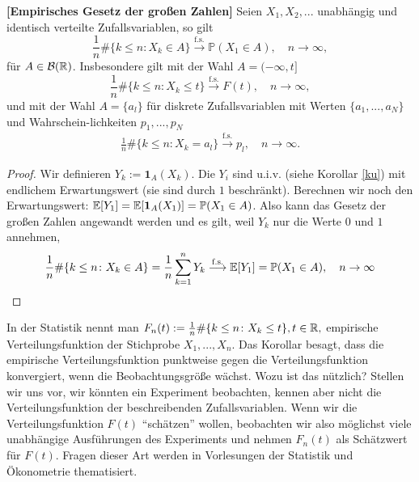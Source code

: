 \begin{anwendung}
 \textbf{[Empirisches Gesetz der großen Zahlen]}
	\makeatletter\def\@currentlabel{EGGZ}\makeatother\label{EGGZ}
	Seien $X_1, X_2, ...$ unabh\"angig und identisch verteilte Zufallsvariablen, so gilt
	 \[ \frac{1}{n} \# \{ k\leq n \colon X_k\in A \}\overset{\text{f.s.}}{\longrightarrow} \mathbb{P}(X_1 \in A), \quad n \to \infty, \]
	für $A \in \mathcal{B}(\mathbb{R})$. Insbesondere gilt mit der Wahl $A = (-\infty,t]$
	\[ \frac{1}{n} \# \{ k \leq n \colon X_k \leq t \} \overset{\text{f.s.}}{\longrightarrow} F(t), \quad n \to \infty, \] und mit der Wahl $A=\{a_l\}$ f\"ur diskrete Zufallsvariablen mit Werten $\{a_1,...,a_N\}$ und Wahrschein-lichkeiten $p_1,...,p_N$
	\begin{align*}
		\frac{1}{n} \# \{ k \leq n \colon X_k =a_l\} \overset{\text{f.s.}}{\longrightarrow} p_l,\quad n\to\infty.
	\end{align*}
\end{anwendung}
\begin{proof}
	Wir definieren $Y_k:=\mathbf{1}_A(X _k)$. Die $Y_i$ sind u.i.v. (siehe Korollar \ref{ku}) mit endlichem Erwartungswert (sie sind durch $1$ beschränkt). Berechnen wir noch den Erwartungswert:  $\mathbb{E}[Y_1] = \mathbb{E}[\mathbf{1}_{A}(X_1)] = \mathbb{P}(X_1 \in A)$. Also kann das Gesetz der gro\ss en Zahlen angewandt werden und es gilt, weil $Y_k$ nur die Werte $0$ und $1$ annehmen,
	 \[ \frac{1}{n} \# \{ k\leq n \colon X_k \in A \} = \frac{1}{n} \sum\limits_{k=1}^{n} Y_k \overset{\text{f.s.}}{\longrightarrow} \mathbb{E}[Y_1] = \mathbb{P}(X_1 \in A), \quad n \to \infty 
	 \]
\end{proof}
In der Statistik nennt man $F_n(t):=\frac{1}{n} \# \{ k \leq n \colon X_k \leq t \}, t\in\mathbb{R},$ empirische Verteilungsfunktion der Stichprobe $X_1, ..., X_n$. Das Korollar besagt, dass die empirische Verteilungsfunktion punktweise gegen die Verteilungsfunktion konvergiert, wenn die Beobachtungsgr\"o\ss e w\"achst. Wozu ist das n\"utzlich? Stellen wir uns vor, wir k\"onnten ein Experiment beobachten, kennen aber nicht die Verteilungsfunktion der beschreibenden Zufallsvariablen. Wenn wir die Verteilungsfunktion $F(t)$ \enquote{sch\"atzen} wollen, beobachten wir also m\"oglichst viele unabh\"angige Ausf\"uhrungen des Experiments und nehmen $F_n(t)$ als Sch\"atzwert f\"ur $F(t)$. Fragen dieser Art werden in Vorlesungen der Statistik und \"Okonometrie thematisiert.


